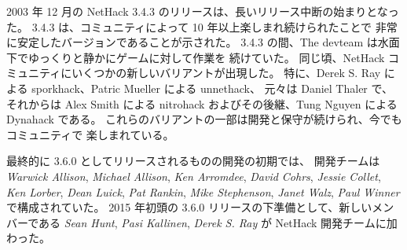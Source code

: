 \medskip
2003 年 12 月の NetHack 3.4.3 のリリースは、長いリリース中断の始まりとなった。
3.4.3 は、コミュニティによって 10 年以上楽しまれ続けられたことで
非常に安定したバージョンであることが示された。
3.4.3 の間、The devteam は水面下でゆっくりと静かにゲームに対して作業を
続けていた。
同じ頃、NetHack コミュニティにいくつかの新しいバリアントが出現した。
特に、Derek S. Ray による sporkhack、Patric Mueller による unnethack、
元々は Daniel Thaler で、それからは Alex Smith による
nitrohack およびその後継、Tung Nguyen による Dynahack である。
これらのバリアントの一部は開発と保守が続けられ、今でもコミュニティで
楽しまれている。

\medskip
最終的に 3.6.0 としてリリースされるものの開発の初期では、
開発チームは {\it Warwick Allison}, 
{\it Michael Allison}, {\it Ken Arromdee},
{\it David Cohrs}, {\it Jessie Collet}, 
{\it Ken Lorber}, {\it Dean Luick}, {\it Pat Rankin}, 
{\it Mike Stephenson}, {\it Janet Walz}, {\it Paul Winner} で構成されていた。
2015 年初頭の 3.6.0 リリースの下準備として、新しいメンバーである
{\it Sean Hunt}, {\it Pasi Kallinen}, {\it Derek S. Ray} が
NetHack 開発チームに加わった。

